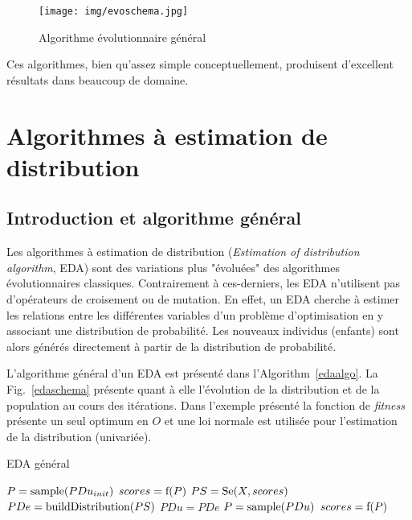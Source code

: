 \documentclass[a4paper, 11pt]{report}
\begin{document}
\begin{figure}[!h]
\centering
\texttt{[image: img/evoschema.jpg]}	
\caption{Algorithme évolutionnaire général~\cite{WIKI_EVO}}
\label{evoschema}
\end{figure}

Ces algorithmes, bien qu'assez simple conceptuellement, produisent d'excellent résultats dans beaucoup de domaine.

\section{Algorithmes à estimation de distribution}
\subsection{Introduction et algorithme général}
\label{edageneral}
Les algorithmes à estimation de distribution (\textit{Estimation of distribution algorithm}, EDA) sont des variations plus "évoluées" des algorithmes évolutionnaires classiques. Contrairement à ces-derniers, les EDA n'utilisent pas d'opérateurs de croisement ou de mutation. En effet, un EDA cherche à estimer les relations entre les différentes variables d'un problème d'optimisation en y associant une distribution de probabilité. Les nouveaux individus (enfants) sont alors générés directement à partir de la distribution de probabilité.

L'algorithme général d'un EDA est présenté dans l'Algorithm~\ref{edaalgo}. La Fig.~\ref{edaschema} présente quant à elle l'évolution de la distribution et de la population au cours des itérations. Dans l'exemple présenté la fonction de \textit{fitness} présente un seul optimum en $O$ et une loi normale est utilisée pour l'estimation de la distribution (univariée).

\begin{algorithm}                      
\caption{EDA général}          
\label{edaalgo}                           
\begin{algorithmic}                    
\STATE $P = \textnormal{sample}(PDu_{init})$ 
\STATE $scores = \textnormal{f}(P)$ 
\STATE $PS = \textnormal{Se}(X, scores)$ 
\STATE $PDe = \textnormal{buildDistribution}(PS)$ 
\STATE $PDu = PDe$
\STATE $P = \textnormal{sample}(PDu)$ 
\STATE $scores = \textnormal{f}(P)$ 
\ENDWHILE
\end{algorithmic}
\end{algorithm}
\end{document}
